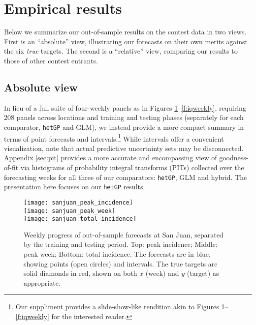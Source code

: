 \documentclass[12pt]{article}
\begin{document}
\section{Empirical results}
\label{sec:empirical}

Below we summarize our out-of-sample results on the contest data in two views.
First is an ``absolute'' view, illustrating our forecasts on their own merits
against the six {\em true} targets. The second is a ``relative'' view,
comparing our results to those of other contest entrants.

\subsection{Absolute view}
\label{sec:raw}

In lieu of a full suite of four-weekly panels as in Figures
\ref{f:sjweekly}--\ref{f:iqweekly}, requiring 208 panels across locations and
training and testing phases (separately for each comparator, {\tt hetGP} and
GLM), we instead provide a more compact summary in terms of point forecasts
and intervals.\footnote{Our suppliment provides a slide-show-like rendition
akin to Figures \ref{f:sjweekly}--\ref{f:iqweekly} for the interested reader.}
While intervals offer a convenient visualization, note that actual predictive
uncertainty sets may be disconnected.  Appendix \ref{sec:pit} provides a more
accurate and encompassing view of goodness-of-fit via histograms of
probability integral transforms (PITs) collected over the forecasting weeks
for all three of our comparators: {\tt hetGP}, GLM and hybrid. The
presentation here focuses on our {\tt hetGP} results.

\begin{figure}[ht!]
\centering
\vspace{-0.1cm}
\texttt{[image: sanjuan\_peak\_incidence]}\\
\texttt{[image: sanjuan\_peak\_week]}\\
\texttt{[image: sanjuan\_total\_incidence]}
\vspace{-0.75cm}
\caption{Weekly progress of out-of-sample forecasts at San Juan, separated by
the training and testing period.  Top: peak incidence; Middle: peak week;
Bottom: total incidence. The forecasts are in blue, showing points (open
circles) and intervals.  The true targets are solid diamonds in red, shown on
both $x$ (week) and $y$ (target) as appropriate.}
\label{f:sjweekly}
\end{figure}
\end{document}
